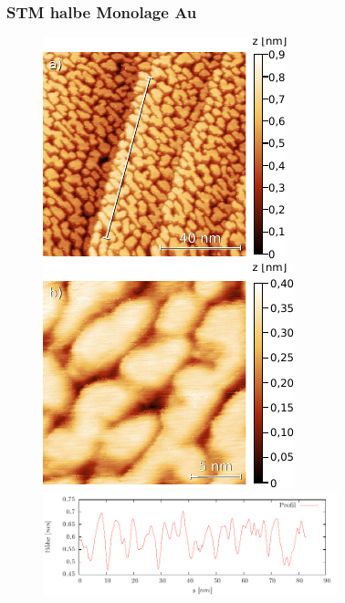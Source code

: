 \documentclass{beamer}
\begin{document}
\begin{frame}
\frametitle{STM halbe Monolage Au}
\begin{figure}
\begin{minipage}[b]{0.45\textwidth} 
		\includegraphics{bilder/profilhalbeMLkleiner}
	\end{minipage}
	\begin{minipage}[b]{0.45\textwidth}
		\includegraphics{bilder/halbeMLkleiner}
	\end{minipage}
	\vfill
	\centering
	\vspace{0.3cm}\hspace{-1.5cm} 
	\includegraphics[height=3cm]{bilder/ProfilhalbeML.pdf}
\end{figure}
\end{frame}
\end{document}
